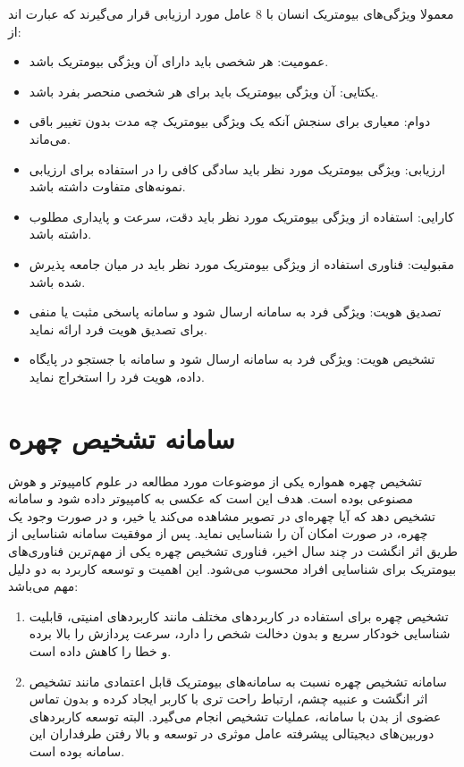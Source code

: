 معمولا ویژگی‌های بیومتریک انسان با 8 عامل مورد ارزیابی قرار می‌گیرند که عبارت اند از:
\begin{itemize}
\item
 عمومیت: هر شخصی باید دارای آن ویژگی بیومتریک باشد.
 \item
 یکتایی: آن ویژگی بیومتریک باید برای هر شخصی منحصر بفرد باشد.
 \item
 دوام: معیاری برای سنجش آنکه یک ویژگی بیومتریک چه مدت بدون تغییر باقی می‌ماند.
 \item
 ارزیابی: ویژگی بیومتریک مورد نظر باید سادگی کافی را در استفاده برای ارزیابی نمونه‌های متفاوت داشته باشد.
 \item
 کارایی: استفاده از ویژگی بیومتریک مورد نظر باید دقت، سرعت و پایداری مطلوب داشته باشد.
 \item
 مقبولیت: فناوری استفاده از ویژگی بیومتریک مورد نظر باید در میان جامعه پذیرش شده باشد.
 \item
 تصدیق هویت: ویژگی فرد به سامانه ارسال شود و سامانه پاسخی مثبت یا منفی برای تصدیق هویت فرد ارائه نماید.
 \item
 تشخیص هویت: ویژگی فرد به سامانه ارسال ‌شود و سامانه با جستجو در پایگاه داده، هویت فرد را استخراج نماید.
\end{itemize} 

\section{سامانه تشخیص چهره}

تشخیص چهره همواره یکی از موضوعات مورد مطالعه در علوم کامپیوتر و هوش مصنوعی بوده است. هدف این است که عکسی به کامپیوتر داده شود و سامانه تشخیص دهد که آیا چهره‌ای در تصویر مشاهده می‌کند یا خیر، و در صورت وجود یک چهره، در صورت امکان آن را شناسایی نماید. پس از موفقیت سامانه شناسایی از طریق اثر انگشت در چند سال اخیر، فناوری تشخیص چهره یکی از مهم‌ترین فناوری‌های بیومتریک برای شناسایی افراد محسوب می‌شود. این اهمیت و توسعه کاربرد به دو دلیل مهم می‌باشد:
\begin{enumerate}
\item
	تشخیص چهره برای استفاده در کاربردهای مختلف مانند کاربرد‌های امنیتی، قابلیت شناسایی خودکار سریع و بدون دخالت شخص را دارد، سرعت پردازش را بالا برده و خطا را کاهش داده است.
\item 
سامانه تشخیص چهره نسبت به سامانه‌های بیومتریک قابل اعتمادی مانند تشخیص اثر انگشت و عنبیه چشم، ارتباط راحت تری با کاربر ایجاد کرده و بدون تماس عضوی از بدن با سامانه، عملیات تشخیص انجام می‌گیرد. البته توسعه کاربردهای دوربین‌های دیجیتالی پیشرفته عامل موثری در توسعه و بالا رفتن طرفداران این سامانه بوده است.
\end{enumerate}

